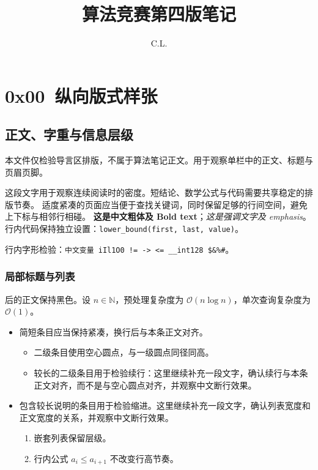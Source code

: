 \documentclass{article}
\title{算法竞赛第四版笔记}
\author{C.L.}
\date{}
\begin{document}
\maketitle
\newpage
\tableofcontents
\section{0x00\ 纵向版式样张}
\subsection{正文、字重与信息层级}
本文件仅检验导言区排版，不属于算法笔记正文。用于观察单栏中的正文、标题与页眉页脚。

这段文字用于观察连续阅读时的密度。短结论、数学公式与代码需要共享稳定的排版节奏。
适度紧凑的页面应当便于查找关键词，同时保留足够的行间空间，避免上下标与相邻行相碰。
\textbf{这是中文粗体及 Bold text}；\emph{这是强调文字及 emphasis}。
行内代码保持独立设置：\texttt{lower\_bound(first, last, value)}。

行内字形检验：\texttt{中文变量 iIl1O0 != -> <= \_\_int128 \$\&\%\#}。


\subsubsection{局部标题与列表}
后的正文保持黑色。设 $n\in\mathbb{N}$，预处理复杂度为
$\mathcal{O}(n\log n)$，单次查询复杂度为 $\mathcal{O}(1)$。
\begin{itemize}
\item 简短条目应当保持紧凑，换行后与本条正文对齐。
  \begin{itemize}
  \item 二级条目使用空心圆点，与一级圆点同径同高。
  \item 较长的二级条目用于检验续行：这里继续补充一段文字，确认续行与本条正文对齐，而不是与空心圆点对齐，并观察中文断行效果。
  \end{itemize}
\item 包含较长说明的条目用于检验缩进。这里继续补充一段文字，确认列表宽度和正文宽度的关系，并观察中文断行效果。
  \begin{enumerate}
  \item 嵌套列表保留层级。
  \item 行内公式 $a_i\leq a_{i+1}$ 不改变行高节奏。
  \end{enumerate}
\end{itemize}
\end{document}
